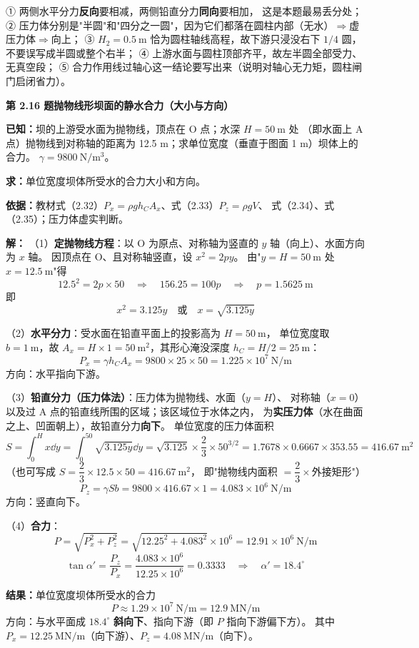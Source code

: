 \begin{yicuo}
① 两侧水平分力\textbf{反向}要相减，两侧铅直分力\textbf{同向}要相加，
这是本题最易丢分处；
② 压力体分别是"半圆"和"四分之一圆"，因为它们都落在圆柱内部（无水）$\Rightarrow$虚压力体$\Rightarrow$向上；
③ $H_2=0.5\ \mathrm{m}$ 恰为圆柱轴线高程，故下游只浸没右下 $1/4$ 圆，
不要误写成半圆或整个右半；
④ 上游水面与圆柱顶部齐平，故左半圆全部受力、无真空段；
⑤ 合力作用线过轴心这一结论要写出来（说明对轴心无力矩，圆柱闸门启闭省力）。
\end{yicuo}

\noindent\textbf{第 2.16 题\quad 抛物线形坝面的静水合力（大小与方向）}

\begin{jie}
\textbf{已知：}坝的上游受水面为抛物线，顶点在 O 点；水深 $H=50\ \mathrm{m}$ 处
（即水面上 A 点）抛物线到对称轴的距离为 12.5 m；求单位宽度（垂直于图面 1 m）坝体上的合力。
$\gamma=9800\ \mathrm{N/m^3}$。

\textbf{求：}单位宽度坝体所受水的合力大小和方向。

\textbf{依据：}教材式（2.32）$P_x=\rho gh_CA_x$、式（2.33）$P_z=\rho gV$、
式（2.34）、式（2.35）；压力体虚实判断。

\textbf{解：}
（1）\textbf{定抛物线方程}：以 O 为原点、对称轴为竖直的 $y$ 轴（向上）、水面方向为 $x$ 轴。
因顶点在 O、且对称轴竖直，设 $x^2=2py$。
由"$y=H=50\ \mathrm{m}$ 处 $x=12.5\ \mathrm{m}$"得
\[ 12.5^2=2p\times50\quad\Rightarrow\quad 156.25=100p\quad\Rightarrow\quad p=1.5625\ \mathrm{m} \]
即
\[ x^2=3.125y\quad\text{或}\quad x=\sqrt{3.125y} \]

（2）\textbf{水平分力}：受水面在铅直平面上的投影高为 $H=50\ \mathrm{m}$，
单位宽度取 $b=1\ \mathrm{m}$，故 $A_x=H\times1=50\ \mathrm{m^2}$，其形心淹没深度 $h_C=H/2=25\ \mathrm{m}$：
\[ P_x=\gamma h_CA_x=9800\times25\times50=1.225\times10^7\ \mathrm{N/m} \]
方向：水平指向下游。

（3）\textbf{铅直分力（压力体法）}：压力体为抛物线、水面（$y=H$）、
对称轴（$x=0$）以及过 A 点的铅直线所围的区域；该区域位于水体之内，
为\textbf{实压力体}（水在曲面之上、凹面朝上），故铅直分力\textbf{向下}。
单位宽度的压力体面积
\[ S=\int_0^{H}x\dd y=\int_0^{50}\sqrt{3.125y}\dd y
=\sqrt{3.125}\times\frac{2}{3}\times50^{3/2}
=1.7678\times0.6667\times353.55=416.67\ \mathrm{m^2} \]
（也可写成 $S=\dfrac{2}{3}\times12.5\times50=416.67\ \mathrm{m^2}$，
即"抛物线内面积 $=\dfrac{2}{3}\times$外接矩形"）
\[ P_z=\gamma S b=9800\times416.67\times1=4.083\times10^6\ \mathrm{N/m} \]
方向：竖直向下。

（4）\textbf{合力}：
\[ P=\sqrt{P_x^2+P_z^2}=\sqrt{12.25^2+4.083^2}\times10^6=12.91\times10^6\ \mathrm{N/m} \]
\[ \tan\alpha'=\frac{P_z}{P_x}=\frac{4.083\times10^6}{12.25\times10^6}=0.3333
\quad\Rightarrow\quad\alpha'=18.4^{\circ} \]

\textbf{结果：}单位宽度坝体所受水的合力
\[ P\approx1.29\times10^7\ \mathrm{N/m}=12.9\ \mathrm{MN/m} \]
方向：与水平面成 $18.4^{\circ}$ \textbf{斜向下}、指向下游（即 $P$ 指向下游偏下方）。
其中 $P_x=12.25\ \mathrm{MN/m}$（向下游）、$P_z=4.08\ \mathrm{MN/m}$（向下）。
\end{jie}

